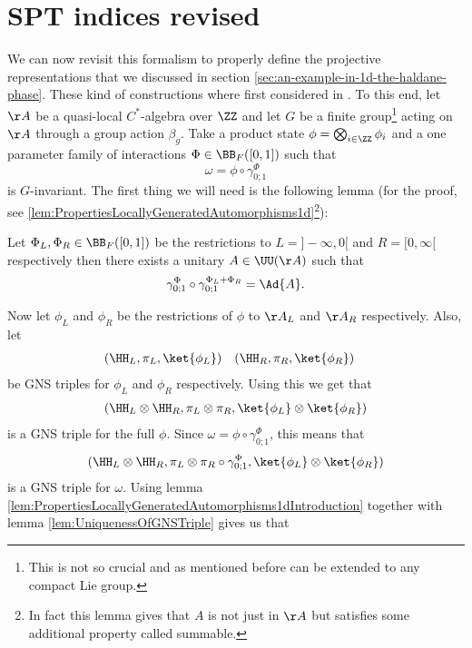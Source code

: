 \section{SPT indices revised}\label{sec:SPT_Indices_Revised}
We can now revisit this formalism to properly define the projective representations that we discussed in section \ref{sec:an-example-in-1d-the-haldane-phase}. These kind of constructions where first considered in \cite{ogata2021classification}. To this end, let $\AA$ be a quasi-local $C^*$-algebra over $\ZZ$ and let $G$ be a finite group\footnote{This is not so crucial and as mentioned before can be extended to any compact Lie group.} acting on $\AA$ through a group action $\beta_g$. Take a product state $\phi=\bigotimes_{i\in\ZZ}\phi_i$ and a one parameter family of interactions $\Phi\in \BB_F([0,1])$ such that
\begin{equation}
\omega=\phi\circ\gamma^\Phi_{0;1}
\end{equation}
is $G$-invariant. The first thing we will need is the following lemma (for the proof, see \ref{lem:PropertiesLocallyGeneratedAutomorphisms1d}\footnote{In fact this lemma gives that $A$ is not just in $\AA$ but satisfies some additional property called summable.}):
\begin{lemma}\label{lem:PropertiesLocallyGeneratedAutomorphisms1dIntroduction}
	Let $\Phi_L,\Phi_R\in\BB_F([0,1])$ be the restrictions to $L=]-\infty,0[$ and $R=[0,\infty[$ respectively then there exists a unitary $A\in\UU(\AA)$ such that
	\begin{equation}
	\gamma^\Phi_{0;1}\circ\gamma^{\Phi_L+\Phi_R}_{0;1}=\Ad{A}.
	\end{equation}
\end{lemma}
Now let $\phi_L$ and $\phi_R$ be the restrictions of $\phi$ to $\AA_L$ and $\AA_R$ respectively. Also, let
\begin{align}
&(\HH_L,\pi_L,\ket{\phi_L})&&(\HH_R,\pi_R,\ket{\phi_R})
\end{align}
be GNS triples for $\phi_L$ and $\phi_R$ respectively. Using this we get that
\begin{align}
(\HH_L\otimes\HH_R,\pi_L\otimes\pi_R,\ket{\phi_L}\otimes\ket{\phi_R})
\end{align}
is a GNS triple for the full $\phi$. Since $\omega=\phi\circ\gamma^\Phi_{0;1}$, this means that
\begin{equation}
(\HH_L\otimes\HH_R,\pi_L\otimes\pi_R\circ\gamma^\Phi_{0;1},\ket{\phi_L}\otimes\ket{\phi_R})
\end{equation}
is a GNS triple for $\omega$. Using lemma \ref{lem:PropertiesLocallyGeneratedAutomorphisms1dIntroduction} together with lemma \ref{lem:UniquenessOfGNSTriple} gives us that
